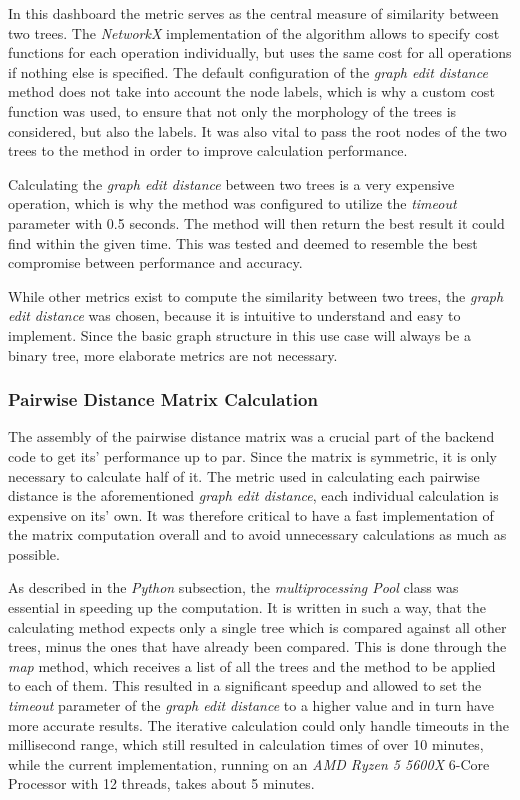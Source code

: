 \documentclass[a4paper, 12pt]{article}
\begin{document}
In this dashboard the metric serves as the central measure of similarity between two trees. The
\textit{NetworkX} implementation of the algorithm allows to specify cost functions for each
operation individually, but uses the same cost for all operations if nothing else is specified.
The default configuration of the \textit{graph edit distance} method does not take into account
the node labels, which is why a custom cost function was used, to ensure that not only the
morphology of the trees is considered, but also the labels. It was also vital to pass the root
nodes of the two trees to the method in order to improve calculation performance. \par

Calculating the \textit{graph edit distance} between two trees is a very expensive operation,
which is why the method was configured to utilize the \textit{timeout} parameter with 0.5 seconds.
The method will then return the best result it could find within the given time. This was tested
and deemed to resemble the best compromise between performance and accuracy. \par

While other metrics exist to compute the similarity between two trees, the \textit{graph edit
    distance} was chosen, because it is intuitive to understand and easy to implement. Since the
basic graph structure in this use case will always be a binary tree, more elaborate metrics
are not necessary.

\subsubsection{Pairwise Distance Matrix Calculation}
The assembly of the pairwise distance matrix was a crucial part of the backend code to get its'
performance up to par. Since the matrix is symmetric, it is only necessary to calculate half of
it. The metric used in calculating each pairwise distance is the aforementioned \textit{graph
    edit distance}, each individual calculation is expensive on its' own. It was therefore critical
to have a fast implementation of the matrix computation overall and to avoid unnecessary
calculations as much as possible. \par

As described in the \textit{Python} subsection, the \textit{multiprocessing Pool} class was
essential in speeding up the computation. It is written in such a way, that the calculating method
expects only a single tree which is compared against all other trees, minus the ones that
have already been compared. This is done through the \textit{map} method, which receives a list
of all the trees and the method to be applied to each of them. This resulted in a significant
speedup and allowed to set the \textit{timeout} parameter of the \textit{graph edit distance}
to a higher value and in turn have more accurate results. The iterative calculation could only
handle timeouts in the millisecond range, which still resulted in calculation times of over 10
minutes, while the current implementation, running on an \textit{AMD Ryzen 5 5600X} 6-Core
Processor with 12 threads, takes about 5 minutes. \par
\end{document}
